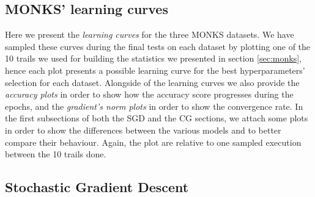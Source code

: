 \begin{appendices}
    \chapter{MONKS' learning curves} %
    \label{cha:monks_learning_curves}
        Here we present the \textit{learning curves} for the three MONKS datasets. We have sampled these curves
        during the final tests on each dataset by plotting one of the 10 trails we used for building the
        statistics we presented in section \ref{sec:monks}, hence each plot presents a possible learning curve
        for the best hyperparameters' selection for each dataset. Alongside of the learning curves
        we also provide the \textit{accuracy plots} in order to show how the accuracy score progresses
        during the epochs, and the \textit{gradient's norm plots} in order to show the convergence
        rate. In the first subsections of both the SGD and the CG sections, we attach some plots in order to show
        the differences between the various models and to better compare their behaviour. Again, the plot are
        relative to one sampled execution between the 10 trails done.

        \section{Stochastic Gradient Descent} %
        \label{sec:stochastic_gradient_descent}




\end{appendices}
